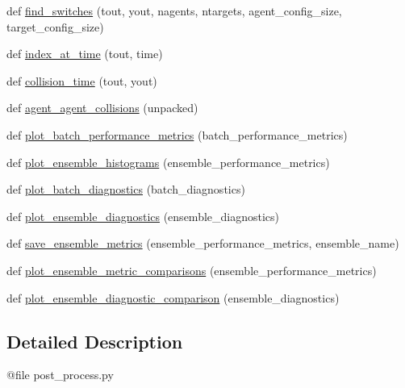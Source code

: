 \begin{DoxyCompactItemize}
\item 
def \mbox{\hyperlink{namespacepost__process_a1192f5e66dab82fd1c9a577784853d38}{find\+\_\+switches}} (tout, yout, nagents, ntargets, agent\+\_\+config\+\_\+size, target\+\_\+config\+\_\+size)
\item 
def \mbox{\hyperlink{namespacepost__process_a390cea7e2e66550ffd937f5e22d641cb}{index\+\_\+at\+\_\+time}} (tout, time)
\item 
def \mbox{\hyperlink{namespacepost__process_ad2fef35161f61e0f47770ae31d9c7cc6}{collision\+\_\+time}} (tout, yout)
\item 
def \mbox{\hyperlink{namespacepost__process_a548242fe2603aa0646c36a3c976978eb}{agent\+\_\+agent\+\_\+collisions}} (unpacked)
\item 
def \mbox{\hyperlink{namespacepost__process_aa4445a673ad2b57be4e22fe0e1cf2413}{plot\+\_\+batch\+\_\+performance\+\_\+metrics}} (batch\+\_\+performance\+\_\+metrics)
\item 
def \mbox{\hyperlink{namespacepost__process_a37ffa7064da3200fff3a6dda3a5787d5}{plot\+\_\+ensemble\+\_\+histograms}} (ensemble\+\_\+performance\+\_\+metrics)
\item 
def \mbox{\hyperlink{namespacepost__process_ad0319250940975f4989aef2f6e3a96b7}{plot\+\_\+batch\+\_\+diagnostics}} (batch\+\_\+diagnostics)
\item 
def \mbox{\hyperlink{namespacepost__process_a32f70cf0b6377a438888111e013d4ca2}{plot\+\_\+ensemble\+\_\+diagnostics}} (ensemble\+\_\+diagnostics)
\item 
def \mbox{\hyperlink{namespacepost__process_a10e87205bfefad170e33d3b2aa386598}{save\+\_\+ensemble\+\_\+metrics}} (ensemble\+\_\+performance\+\_\+metrics, ensemble\+\_\+name)
\item 
def \mbox{\hyperlink{namespacepost__process_a1c9f01d3b7c28ba49dfc907d77a129e0}{plot\+\_\+ensemble\+\_\+metric\+\_\+comparisons}} (ensemble\+\_\+performance\+\_\+metrics)
\item 
def \mbox{\hyperlink{namespacepost__process_ac6e21bb76233fe218be2b64d33122a0b}{plot\+\_\+ensemble\+\_\+diagnostic\+\_\+comparison}} (ensemble\+\_\+diagnostics)
\end{DoxyCompactItemize}


\subsection{Detailed Description}
\begin{DoxyVerb}@file post_process.py
\end{DoxyVerb}
 

